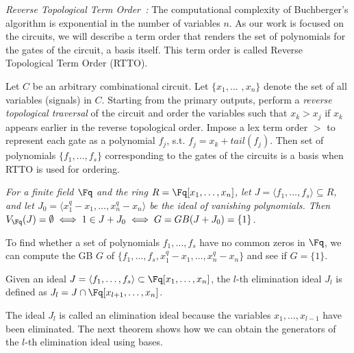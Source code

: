 \begin{Definition}
\label{def:rtto}
\par {\it Reverse Topological Term Order~\cite{lv:tcad2013}:}
The computational complexity of Buchberger's algorithm is exponential
in the number of variables $n$. As our work is focused on the circuits,
we will describe a term order that renders the set of polynomials for 
the gates of the circuit, a \Grobner basis itself. This term order 
is called Reverse Topological Term Order (RTTO).

\par Let $C$ be an arbitrary combinational
circuit. Let $\{x_1, \dots$ $, x_n\}$ denote the set of all variables
(signals) in $C$. Starting from the primary outputs, perform
a {\it reverse topological traversal} of the circuit and order the
variables such that $x_k > x_j$ if $x_k$ appears earlier in the
reverse topological order. Impose a lex term order $>$ to represent each
gate as a polynomial $f_j$, s.t. $f_j = x_k + tail(f_j)$. Then 
set of polynomials $\{f_1,\dots,f_s\}$ corresponding to the gates of the circuits 
is a \Grobner basis when RTTO is used for ordering.
\end{Definition}
\begin{Theorem}
\label{thm:weak-ns-ff}
{\it For a finite field $\Fq$ and the ring $R = \Fq[x_1, \dots, x_n]$, let
$J = \langle f_1, \dots, f_s\rangle \subseteq R$, and let $J_0 = \langle
x_1^q-x_1, \dots, x_n^q -  x_n\rangle$ be the ideal of vanishing
polynomials. Then $V_{\Fq}(J) = \emptyset \iff 1 \in J + J_0 \iff G =
GB(J+J_0) = \{1\}$. }

\par To find whether a set of polynomials $f_1,\dots,f_s$ have no common
zeros in $\Fq$, we can compute the GB $G$ of
$\{f_1,\dots,f_s,x_1^q-x_1,\dots,x_n^q-x_n\}$ and see if $G = \{1\}$. 
\end{Theorem}

\begin{Definition}
Given an ideal $J = \langle f_1, \dots, f_s\rangle \subset \Fq[x_1,\dots,x_n]$, the $l$-th elimination
ideal $J_l$ is defined as $J_l = J \cap \Fq[x_{l+1},\dots,x_n]$.
\end{Definition}

The ideal $J_l$ is called an elimination ideal because the variables $x_1,\dots,x_{l-1}$
have been eliminated.
The next theorem shows how we can obtain the generators of the $l$-th
elimination ideal using \Grobner bases.

